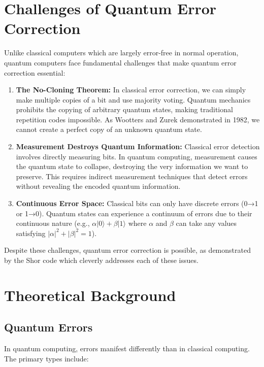 \documentclass[12pt,a4paper]{article}
\begin{document}
\section{Challenges of Quantum Error Correction}

Unlike classical computers which are largely error-free in normal operation, quantum computers face fundamental challenges that make quantum error correction essential:

\begin{enumerate}
    \item \textbf{The No-Cloning Theorem:} In classical error correction, we can simply make multiple copies of a bit and use majority voting. Quantum mechanics prohibits the copying of arbitrary quantum states, making traditional repetition codes impossible. As Wootters and Zurek demonstrated in 1982, we cannot create a perfect copy of an unknown quantum state.
    
    \item \textbf{Measurement Destroys Quantum Information:} Classical error detection involves directly measuring bits. In quantum computing, measurement causes the quantum state to collapse, destroying the very information we want to preserve. This requires indirect measurement techniques that detect errors without revealing the encoded quantum information.
    
    \item \textbf{Continuous Error Space:} Classical bits can only have discrete errors (0→1 or 1→0). Quantum states can experience a continuum of errors due to their continuous nature (e.g., $\alpha |0\rangle + \beta |1\rangle$ where $\alpha$ and $\beta$ can take any values satisfying $|\alpha|^2 + |\beta|^2 = 1$).
\end{enumerate}

Despite these challenges, quantum error correction is possible, as demonstrated by the Shor code which cleverly addresses each of these issues.



\section{Theoretical Background}

\subsection{Quantum Errors}

In quantum computing, errors manifest differently than in classical computing. The primary types include:
\end{document}
